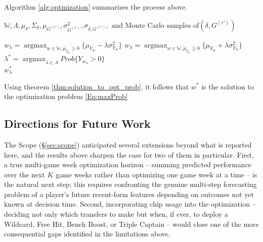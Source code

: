 \documentclass[12pt,oneside,a4paper]{book}
\theoremstyle{definition}
\theoremstyle{remark}
\DeclareMathOperator*{\argmax}{argmax}
\begin{document}
					Algorithm \ref{alg:optmization} summarizes the process above.


					\begin{algorithm}
						\caption{Optimization for the Problem }
						\label{alg:optmization}
						\begin{algorithmic}[1]
							\Require $\mathbb{W}, \Lambda, \mu_\delta, \Sigma_{\delta}, \mu_{G^(r')}, \sigma^2_{G^(r')}, \sigma_{\delta, G^{(r')}}, \text{ and Monte Carlo samples of} (\delta, G^{(r')})$

							\ForAll{ $\lambda \in  \Lambda$}
							\State $w_\lambda = \argmax_{w \in \mathbb{W}, \mu_{Y_w} \ge 0 } \{\mu_{Y_w} - \lambda\sigma^2_{Y_w}\}$
							\EndFor
							\Else
							\ForAll{ $\lambda \in  \Lambda$}
							\State $w_\lambda = \argmax_{w \in \mathbb{W}, \mu_{Y_w} \ge 0 } \{\mu_{Y_w} + \lambda\sigma^2_{Y_w}\}$
							\EndFor
							\EndIf
							\State  $\lambda^* = \argmax_{ \lambda \in \Lambda } Prob\{Y_{w_\lambda} > 0 \}$\\
							\Return $w_\lambda^*$
						\end{algorithmic}
					\end{algorithm}
			Using theorem \ref{thm:solution_to_opt_prob}, it follows that $w^*$ is the solution to the optimization problem \ref{Eq:maxProb}


			\subsection{Directions for Future Work}
				The Scope (\S\ref{sec:scope}) anticipated several extensions beyond what is reported here, and the results above sharpen the case for two of them in particular. First, a true multi-game week optimization horizon -- summing predicted performance over the next $K$ game weeks rather than optimizing one game week at a time -- is the natural next step; this requires confronting the genuine multi-step forecasting problem of a player's future recent-form features depending on outcomes not yet known at decision time. Second, incorporating chip usage into the optimization -- deciding not only which transfers to make but when, if ever, to deploy a Wildcard, Free Hit, Bench Boost, or Triple Captain -- would close one of the more consequential gaps identified in the limitations above.
\end{document}

